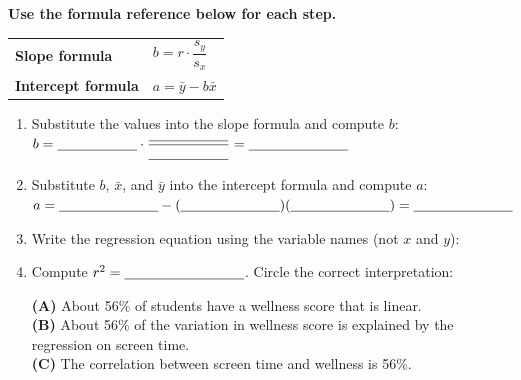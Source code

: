 \documentclass[10pt]{article}
\begin{document}
\begin{tcolorbox}[colback=redbg, colframe=black!40, boxrule=0.7pt, arc=2mm,
    left=4mm, right=4mm, top=2.5mm, bottom=2.5mm,
    title={\textbf{Tier R --- Remediate}}, fonttitle=\bfseries]
\small

\textbf{Use the formula reference below for each step.}

\vspace{4pt}
\begin{tabularx}{\linewidth}{@{} >{\bfseries}p{4cm} X @{}}
Slope formula & $b = r \cdot \dfrac{s_y}{s_x}$ \\[4pt]
Intercept formula & $a = \bar{y} - b\bar{x}$ \\
\end{tabularx}

\vspace{8pt}
\begin{enumerate}[leftmargin=1.6em, itemsep=0.16in]
  \item Substitute the values into the slope formula and compute $b$:\\[6pt]
        $b = \blank{2cm} \cdot \dfrac{\blank{2cm}}{\blank{2cm}} = \blank{2.5cm}$

  \item Substitute $b$, $\bar{x}$, and $\bar{y}$ into the intercept formula and compute $a$:\\[6pt]
        $a = \blank{2.5cm} - (\blank{2.5cm})(\blank{2.5cm}) = \blank{2.5cm}$

  \item Write the regression equation using the variable names (not $x$ and $y$):\\[6pt]
        \blank{10cm}

  \item Compute $r^2 = \blank{3cm}$. Circle the correct interpretation:

        \vspace{6pt}
        \textbf{(A)} About 56\% of students have a wellness score that is linear.\\
        \textbf{(B)} About 56\% of the variation in wellness score is explained by the regression on screen time.\\
        \textbf{(C)} The correlation between screen time and wellness is 56\%.
\end{enumerate}
\end{tcolorbox}

\vspace{0.12in}
\end{document}
